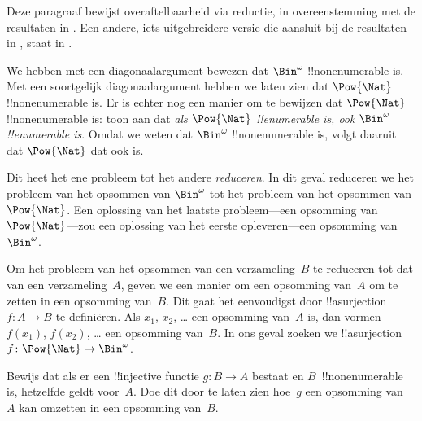 \documentclass[../../../include/open-logic-section]{subfiles}
\begin{document}


\begin{editorial}
  Deze paragraaf bewijst overaftelbaarheid via reductie, in
  overeenstemming met de resultaten in . Een
  andere, iets uitgebreidere versie die aansluit bij de resultaten in
  , staat in .
\end{editorial}

We hebben met een diagonaalargument bewezen dat $\Bin^\omega$
!!{nonenumerable} is. Met een soortgelijk diagonaalargument hebben we
laten zien dat $\Pow{\Nat}$ !!{nonenumerable} is. Er is echter nog een
manier om te bewijzen dat $\Pow{\Nat}$ !!{nonenumerable} is: toon aan
dat \emph{als $\Pow{\Nat}$ !!{enumerable} is, ook $\Bin^\omega$
!!{enumerable} is}. Omdat we weten dat $\Bin^\omega$
!!{nonenumerable} is, volgt daaruit dat $\Pow{\Nat}$ dat ook is.

Dit heet het ene probleem tot het andere \emph{reduceren}. In dit
geval reduceren we het probleem van het opsommen van $\Bin^\omega$ tot
het probleem van het opsommen van $\Pow{\Nat}$. Een oplossing van het
laatste probleem---een opsomming van $\Pow{\Nat}$---zou een oplossing
van het eerste opleveren---een opsomming van $\Bin^\omega$.

Om het probleem van het opsommen van een verzameling~$B$ te reduceren
tot dat van een verzameling~$A$, geven we een manier om een opsomming
van~$A$ om te zetten in een opsomming van~$B$. Dit gaat het
eenvoudigst door !!a{surjection} $f\colon A \to B$ te definiëren. Als
$x_1$, $x_2$, \dots{} een opsomming van~$A$ is, dan vormen $f(x_1)$,
$f(x_2)$, \dots{} een opsomming van~$B$. In ons geval zoeken we
!!a{surjection} $f\colon \Pow{\Nat} \to \Bin^\omega$.

\begin{prob}
Bewijs dat als er een !!{injective} functie $g\colon B \to A$ bestaat
en $B$~!!{nonenumerable} is, hetzelfde geldt voor~$A$. Doe dit door te
laten zien hoe~$g$ een opsomming van~$A$ kan omzetten in een opsomming
van~$B$.
\end{prob}
\end{document}
